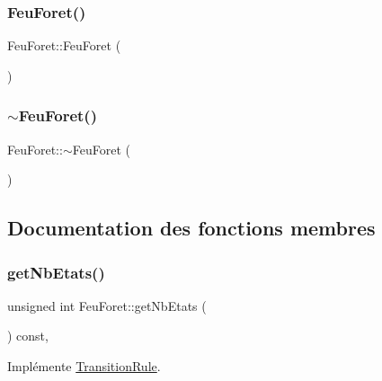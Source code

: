 \subsubsection{\texorpdfstring{Feu\+Foret()}{FeuForet()}}
{\footnotesize\ttfamily Feu\+Foret\+::\+Feu\+Foret (\begin{DoxyParamCaption}{ }\end{DoxyParamCaption})\hspace{0.3cm}{\ttfamily [default]}}

\mbox{\label{class_feu_foret_a641b5dbf3bd9da624dd1259cd8594d19}} 
\subsubsection{\texorpdfstring{$\sim$\+Feu\+Foret()}{~FeuForet()}}
{\footnotesize\ttfamily Feu\+Foret\+::$\sim$\+Feu\+Foret (\begin{DoxyParamCaption}{ }\end{DoxyParamCaption})\hspace{0.3cm}{\ttfamily [default]}}



\subsection{Documentation des fonctions membres}
\mbox{\label{class_feu_foret_a5ad4bbdbb10a73abf63e15698d678bbd}} 
\subsubsection{\texorpdfstring{get\+Nb\+Etats()}{getNbEtats()}}
{\footnotesize\ttfamily unsigned int Feu\+Foret\+::get\+Nb\+Etats (\begin{DoxyParamCaption}{ }\end{DoxyParamCaption}) const\hspace{0.3cm}{\ttfamily [inline]}, {\ttfamily [virtual]}}



Implémente \mbox{\hyperlink{class_transition_rule_ad5bbcc6ef292bb079d8980f00d011a90}{Transition\+Rule}}.

\mbox{\label{class_feu_foret_ab793aa05ae4163ac380a6ce1a43ce19c}} 
